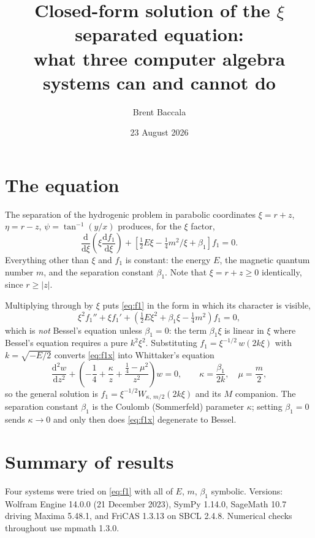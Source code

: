 \documentclass[11pt]{article}
\title{Closed-form solution of the $\xi$ separated equation:\\
       what three computer algebra systems can and cannot do}
\author{Brent Baccala}
\date{23 August 2026}
\begin{document}
\maketitle

\section{The equation}

The separation of the hydrogenic problem in parabolic coordinates
$\xi=r+z$, $\eta=r-z$, $\psi=\tan^{-1}(y/x)$ produces, for the $\xi$
factor,
\begin{equation}\label{eq:f1}
\frac{\mathrm{d}}{\mathrm{d}\xi}\left(\xi\frac{\mathrm{d}f_1}{\mathrm{d}\xi}\right)
  +\left[\tfrac{1}{2}E\xi-\tfrac{1}{4}m^2/\xi+\beta_1\right]f_1 = 0 .
\end{equation}
Everything other than $\xi$ and $f_1$ is constant: the energy $E$, the
magnetic quantum number $m$, and the separation constant $\beta_1$.
Note that $\xi = r+z \geq 0$ identically, since $r\geq|z|$.

Multiplying through by $\xi$ puts \eqref{eq:f1} in the form in which its
character is visible,
\begin{equation}\label{eq:f1x}
\xi^2 f_1'' + \xi f_1' + \left(\tfrac{1}{2}E\xi^2 + \beta_1\xi
  - \tfrac{1}{4}m^2\right) f_1 = 0 ,
\end{equation}
which is \emph{not} Bessel's equation unless $\beta_1=0$: the term
$\beta_1\xi$ is linear in $\xi$ where Bessel's equation requires a pure
$k^2\xi^2$. Substituting $f_1 = \xi^{-1/2}\,w(2k\xi)$ with
$k=\sqrt{-E/2}$ converts \eqref{eq:f1x} into Whittaker's equation
\begin{equation}\label{eq:whittaker}
\frac{\mathrm{d}^2 w}{\mathrm{d}z^2}
  + \left(-\frac{1}{4} + \frac{\kappa}{z}
          + \frac{\tfrac{1}{4}-\mu^2}{z^2}\right) w = 0 ,
\qquad \kappa = \frac{\beta_1}{2k},\quad \mu = \frac{m}{2},
\end{equation}
so the general solution is
$f_1 = \xi^{-1/2} W_{\kappa,\,m/2}(2k\xi)$ and its $M$ companion.  The
separation constant $\beta_1$ is the Coulomb (Sommerfeld) parameter
$\kappa$; setting $\beta_1=0$ sends $\kappa\to0$ and only then does
\eqref{eq:f1x} degenerate to Bessel.

\section{Summary of results}

Four systems were tried on \eqref{eq:f1} with all of $E$, $m$, $\beta_1$
symbolic.  Versions: Wolfram Engine 14.0.0 (21 December 2023), SymPy
1.14.0, SageMath 10.7 driving Maxima 5.48.1, and FriCAS 1.3.13 on SBCL
2.4.8.  Numerical checks throughout use mpmath 1.3.0.
\end{document}

